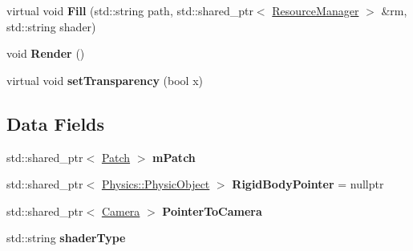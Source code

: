 \begin{DoxyCompactItemize}
\item 
virtual void {\bfseries Fill} (std\+::string path, std\+::shared\+\_\+ptr$<$ \hyperlink{class_resource_manager}{Resource\+Manager} $>$ \&rm, std\+::string shader)\hypertarget{class_component_1_1_cloth_component_a97e68ce0ee8a6f236f01969ced6b5140}{}\label{class_component_1_1_cloth_component_a97e68ce0ee8a6f236f01969ced6b5140}

\item 
void {\bfseries Render} ()\hypertarget{class_component_1_1_cloth_component_a18bbb264c9e8838068a7004258b7b3a8}{}\label{class_component_1_1_cloth_component_a18bbb264c9e8838068a7004258b7b3a8}

\item 
virtual void {\bfseries set\+Transparency} (bool x)\hypertarget{class_component_1_1_cloth_component_a0517b1f0aebec214588a8a8e7b5df8ea}{}\label{class_component_1_1_cloth_component_a0517b1f0aebec214588a8a8e7b5df8ea}

\end{DoxyCompactItemize}
\subsection*{Data Fields}
\begin{DoxyCompactItemize}
\item 
std\+::shared\+\_\+ptr$<$ \hyperlink{class_patch}{Patch} $>$ {\bfseries m\+Patch}\hypertarget{class_component_1_1_cloth_component_ae4cf4f211f24417a59b60ce4b2eb9e13}{}\label{class_component_1_1_cloth_component_ae4cf4f211f24417a59b60ce4b2eb9e13}

\item 
std\+::shared\+\_\+ptr$<$ \hyperlink{class_physics_1_1_physic_object}{Physics\+::\+Physic\+Object} $>$ {\bfseries Rigid\+Body\+Pointer} = nullptr\hypertarget{class_component_1_1_cloth_component_a35128603dac4023fa535f8b0d28e9332}{}\label{class_component_1_1_cloth_component_a35128603dac4023fa535f8b0d28e9332}

\item 
std\+::shared\+\_\+ptr$<$ \hyperlink{class_camera}{Camera} $>$ {\bfseries Pointer\+To\+Camera}\hypertarget{class_component_1_1_cloth_component_a81e871d180ce755dd3f0c73982b955ab}{}\label{class_component_1_1_cloth_component_a81e871d180ce755dd3f0c73982b955ab}

\item 
std\+::string {\bfseries shader\+Type}\hypertarget{class_component_1_1_cloth_component_ae35886ac9a93ab8547dbbc026190b716}{}\label{class_component_1_1_cloth_component_ae35886ac9a93ab8547dbbc026190b716}

\end{DoxyCompactItemize}


